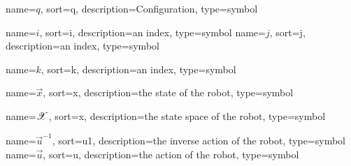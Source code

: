 	{%
		name=\ensuremath{q},
		sort=q,
		description=Configuration,
		type=symbol
	}
	\newcommand{\configuration}{\gls{sym:configuration}}

	{%
		name=\ensuremath{i},
		sort=i,
		description=an index,
		type=symbol
	}
	\newcommand{\indexi}{\gls{sym:indexi}}
	{%
		name=\ensuremath{j},
		sort=j,
		description=an index,
		type=symbol
	}
	\newcommand{\indexj}{\gls{sym:indexj}}

	{%
		name=\ensuremath{k},
		sort=k,
		description=an index,
		type=symbol
	}
	\newcommand{\indexk}{\gls{sym:indexk}}

	{%
		name=\ensuremath{\vec{x}},
		sort=x,
		description=the state  of the robot,
		type=symbol
	}
	\newcommand{\state}{\gls{sym:state}}

	{%
		name=\ensuremath{\vecspace{X}},
		sort=x,
		description=the state space of the robot,
		type=symbol
	}
	\newcommand{\statespace}{\gls{sym:statespace}}

	\newcommand{\phasespace}{\statespace}

	{%
		name=\ensuremath{\vec{u}^{-1}},
		sort=u1,
		description=the inverse action  of the robot,
		type=symbol
	}
	\newcommand{\invaction}{\gls{sym:invaction}}
	{%
		name=\ensuremath{\vec{u}},
		sort=u,
		description=the action  of the robot,
		type=symbol
	}
	\newcommand{\action}{\gls{sym:action}}

